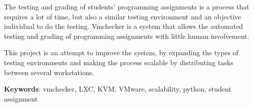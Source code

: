 
The testing and grading of students' programming assignments is a process 
that requires a lot of time, but also a similar testing environment and 
an objective individual to do the testing.
Vmchecker is a system that allows the automated testing and grading of 
programming assignments with little human involvement.

This project is an attempt to improve the system, by expanding the types of
testing environments and making the process scalable by distributing tasks 
between several workstations.


{\bf Keywords}: vmchecker, LXC, KVM, VMware, scalability, python, student assignment
